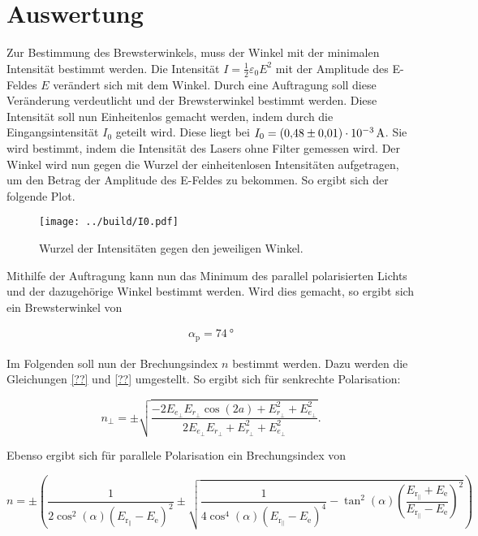 


\section{Auswertung}
\label{sec:Auswertung}

Zur Bestimmung des Brewsterwinkels, muss der Winkel mit der minimalen Intensität bestimmt werden. 
Die Intensität $I=\frac1 2 \varepsilon_0 E^2$ mit der Amplitude des E-Feldes $E$ verändert sich mit dem Winkel. 
Durch eine Auftragung soll diese Veränderung verdeutlicht und der Brewsterwinkel bestimmt werden. 
Diese Intensität soll nun Einheitenlos gemacht werden, indem durch die Eingangsintensität $I_0$ geteilt wird. 
Diese liegt bei $I_0=\qty{0.48\pm0.01e-3}{\ampere}$. Sie wird bestimmt, indem die Intensität des Lasers ohne 
Filter gemessen wird. 
Der Winkel wird nun gegen die Wurzel der einheitenlosen Intensitäten aufgetragen, um den Betrag der Amplitude des E-Feldes zu bekommen. 
So ergibt sich der folgende Plot.

\begin{figure}
    \centering
    \texttt{[image: ../build/I0.pdf]}
    \caption{Wurzel der Intensitäten gegen den jeweiligen Winkel.}
\end{figure}

\noindent Mithilfe der Auftragung kann nun das Minimum des parallel polarisierten Lichts und der dazugehörige Winkel bestimmt werden. 
Wird dies gemacht, so ergibt sich ein Brewsterwinkel von 

\begin{align}
    \alpha_\text{p} = \qty{74}{\degree}
\end{align}

\noindent Im Folgenden soll nun der Brechungsindex $n$ bestimmt werden. Dazu werden die Gleichungen \eqref{??} und \eqref{??} umgestellt. 
So ergibt sich für senkrechte Polarisation:

\begin{equation}
    n_\bot = \pm\sqrt{\frac{-2 E_{e_\bot} E_{r_\bot} \cos{(2a)} + E_{r_\bot}^2 + E_{e_\bot}^2 }{ 2 E_{e_\bot} E_{r_\bot} + E_{r_\bot}^2 + E_{e_\bot}^2  }}.
\end{equation}

\noindent Ebenso ergibt sich für parallele Polarisation ein Brechungsindex von 

\begin{equation}
    n = \pm \left( \frac{1}{2 \cos^2(\alpha) (E_{\text{r}_\parallel} - E_\text{e})^2} \pm \sqrt{\frac{1}{4 \cos^4(\alpha) (E_{\text{r}_\parallel} - E_\text{e})^4} - \tan^2(\alpha) \left(\frac{E_{\text{r}_\parallel} + E_\text{e}}{E_{\text{r}_\parallel} - E_\text{e}} \right)^2} \right)
\end{equation}

